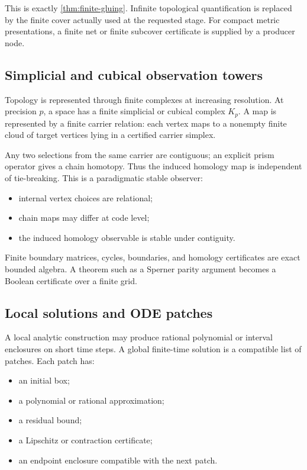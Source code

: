 This is exactly \cref{thm:finite-gluing}.  Infinite topological quantification is replaced by the finite cover actually used at the requested stage.  For compact metric presentations, a finite net or finite subcover certificate is supplied by a producer node.

\subsection{Simplicial and cubical observation towers}

Topology is represented through finite complexes at increasing resolution.  At precision \(p\), a space has a finite simplicial or cubical complex \(K_p\).  A map is represented by a finite carrier relation: each vertex maps to a nonempty finite cloud of target vertices lying in a certified carrier simplex.

Any two selections from the same carrier are contiguous; an explicit prism operator gives a chain homotopy.  Thus the induced homology map is independent of tie-breaking.  This is a paradigmatic stable observer:

\begin{itemize}
\item internal vertex choices are relational;
\item chain maps may differ at code level;
\item the induced homology observable is stable under contiguity.
\end{itemize}

Finite boundary matrices, cycles, boundaries, and homology certificates are exact bounded algebra.  A theorem such as a Sperner parity argument becomes a Boolean certificate over a finite grid.

\subsection{Local solutions and ODE patches}

A local analytic construction may produce rational polynomial or interval enclosures on short time steps.  A global finite-time solution is a compatible list of patches.  Each patch has:

\begin{itemize}
\item an initial box;
\item a polynomial or rational approximation;
\item a residual bound;
\item a Lipschitz or contraction certificate;
\item an endpoint enclosure compatible with the next patch.
\end{itemize}


